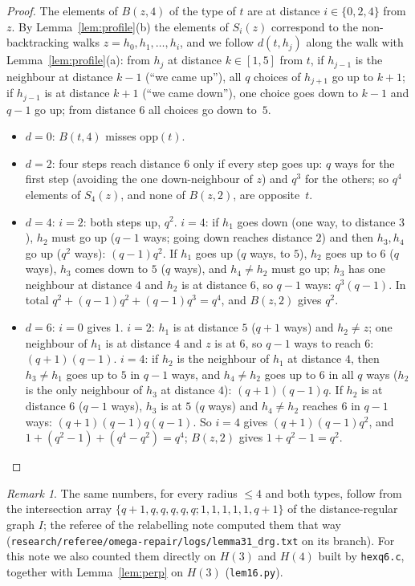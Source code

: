 \documentclass[11pt]{amsart}
\newcommand{\file}[1]{\nolinkurl{#1}}
\theoremstyle{plain}
\theoremstyle{definition}
\theoremstyle{remark}
\newtheorem*{remark}{Remark}
\newcommand{\opp}{\mathrm{opp}}
\begin{document}
\begin{proof}
The elements of $B(z,4)$ of the type of $t$ are at distance $i \in \{0,2,4\}$ from $z$. By
Lemma~\ref{lem:profile}(b) the elements of $S_i(z)$ correspond to the non-backtracking walks $z = h_0, h_1, \dots, h_i$,
and we follow $d(t,h_j)$ along the walk with Lemma~\ref{lem:profile}(a): from $h_j$ at distance $k \in [1,5]$ from $t$,
if $h_{j-1}$ is the neighbour at distance $k-1$ (``we came up''), all $q$ choices of $h_{j+1}$ go up to $k+1$; if
$h_{j-1}$ is at distance $k+1$ (``we came down''), one choice goes down to $k-1$ and $q-1$ go up; from distance $6$
all choices go down to~$5$.
\begin{itemize}[leftmargin=1.5em]
\item $d = 0$: $B(t,4)$ misses $\opp(t)$.
\item $d = 2$: four steps reach distance $6$ only if every step goes up: $q$ ways for the first step (avoiding the one
  down-neighbour of $z$) and $q^3$ for the others; so $q^4$ elements of $S_4(z)$, and none of $B(z,2)$, are opposite~$t$.
\item $d = 4$: $i = 2$: both steps up, $q^2$. $i = 4$: if $h_1$ goes down (one way, to distance $3$), $h_2$ must go up
  ($q-1$ ways; going down reaches distance $2$) and then $h_3, h_4$ go up ($q^2$ ways): $(q-1)q^2$. If $h_1$ goes up ($q$
  ways, to $5$), $h_2$ goes up to $6$ ($q$ ways), $h_3$ comes down to $5$ ($q$ ways), and $h_4 \ne h_2$ must go up; $h_3$
  has one neighbour at distance $4$ and $h_2$ is at distance $6$, so $q-1$ ways: $q^3(q-1)$. In total
  $q^2 + (q-1)q^2 + (q-1)q^3 = q^4$, and $B(z,2)$ gives $q^2$.
\item $d = 6$: $i = 0$ gives $1$. $i = 2$: $h_1$ is at distance $5$ ($q+1$ ways) and $h_2 \ne z$; one neighbour of $h_1$
  is at distance $4$ and $z$ is at $6$, so $q-1$ ways to reach $6$: $(q+1)(q-1)$. $i = 4$: if $h_2$ is the neighbour of
  $h_1$ at distance $4$, then $h_3 \ne h_1$ goes up to $5$ in $q-1$ ways, and $h_4 \ne h_2$ goes up to $6$ in all $q$ ways
  ($h_2$ is the only neighbour of $h_3$ at distance $4$): $(q+1)(q-1)q$. If $h_2$ is at distance $6$ ($q-1$ ways), $h_3$
  is at $5$ ($q$ ways) and $h_4 \ne h_2$ reaches $6$ in $q-1$ ways: $(q+1)(q-1)q(q-1)$. So $i = 4$ gives
  $(q+1)(q-1)q^2$, and $1 + (q^2-1) + (q^4-q^2) = q^4$; $B(z,2)$ gives $1 + q^2 - 1 = q^2$.\qedhere
\end{itemize}
\end{proof}

\begin{remark}
The same numbers, for every radius $\le 4$ and both types, follow from the intersection array
$\{q+1, q, q, q, q, q; 1, 1, 1, 1, 1, q+1\}$ of the distance-regular graph $I$; the referee of the relabelling note
computed them that way (\file{research/referee/omega-repair/logs/lemma31_drg.txt} on its branch). For this note we also counted them directly on $H(3)$ and
$H(4)$ built by \file{hexq6.c}, together with Lemma~\ref{lem:perp} on $H(3)$ (\file{lem16.py}).
\end{remark}
\end{document}
